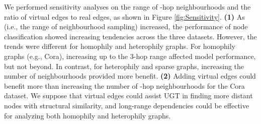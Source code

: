 \documentclass[oneside]{article}
\begin{document}
We performed sensitivity analyses on the range of -hop neighbourhoods and the ratio of virtual edges to real edges, as shown in Figure \ref{fig:Sensitivity}.
\textbf{(1)} As  (i.e., the range of neighbourhood sampling) increased, the performance of node classification showed increasing tendencies across the three datasets.
However, the trends were different for homophily and heterophily graphs.
For homophily graphs (e.g., Cora), increasing  up to the 3-hop range affected model performance, but not beyond.
In contrast, for heterophily and sparse graphs, increasing the number of neighbourhoods provided more benefit.
\textbf{(2)} Adding virtual edges could benefit more than increasing the number of -hop neighbourhoods for the Cora dataset.
We suppose that virtual edges could assist UGT in finding more distant nodes with structural similarity, and long-range dependencies could be effective for analyzing both homophily and heterophily graphs.





































   
\end{document}
